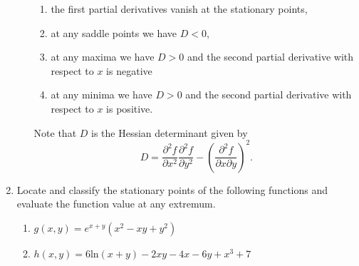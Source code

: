 \documentclass[a4paper]{amsart}
\begin{document}
\begin{enumerate}
\begin{enumerate}
    \begin{enumerate}
    \item
    the first partial derivatives vanish at the stationary points,
    \item at any saddle points we have $D < 0$,
    \item
    at any maxima we have $D > 0$ and the second partial derivative with respect to $x$ is negative
    \item
    at any minima we have $D > 0$ and the second partial derivative with respect to $x$ is positive.
    \end{enumerate}
    Note that $D$ is the Hessian determinant given by 
    $$D= \frac{\partial^2 f}{\partial x^2}\frac{\partial^2 f}{\partial y^2} - \left ( \frac{\partial^2 f}{\partial x \partial y}\right )^2 .$$
    \end{enumerate}
    \item
    Locate and classify the stationary points of the following functions and evaluate the function value at any extremum.
    \begin{enumerate}
    \item
    $g(x,y)=e^{x+y} ( x^2 - xy + y^2)$
    \item
    $h(x,y) = 6 \text{ln} (x+y) - 2xy -4 x - 6y + x^3 + 7$
    \end{enumerate}
    \end{enumerate}
\end{document}
